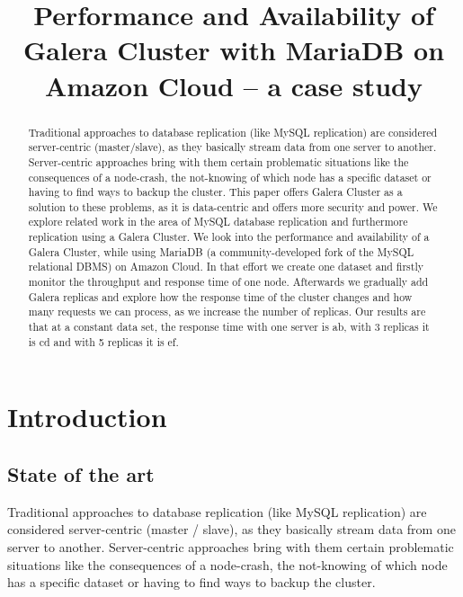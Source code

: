 \documentclass{sig-alternate}
\begin{document}

\doi{-}
\isbn{-}

\title{Performance and Availability of Galera Cluster with MariaDB on Amazon Cloud – a case study}



\maketitle
\begin{abstract}
Traditional approaches to database replication (like MySQL replication) are considered server-centric (master/slave), as they basically stream data from one server to another. Server-centric approaches bring with them certain problematic situations like the consequences of a node-crash, the not-knowing of which node has a specific dataset or having to find ways to backup the cluster. This paper offers Galera Cluster as a solution to these problems, as it is data-centric and offers more security and power. We explore related work in the area of MySQL database replication and furthermore replication using a Galera Cluster. We look into the performance and availability of a Galera Cluster, while using MariaDB (a community-developed fork of the MySQL relational DBMS) on Amazon Cloud. In that effort we create one dataset and firstly monitor the throughput and response time of one node. Afterwards we gradually add Galera replicas and explore how the response time of the cluster changes and how many requests we can process, as we increase the number of replicas. Our results are that at a constant data set, the response time with one server is ab, with 3 replicas it is cd and with 5 replicas it is ef.
\end{abstract}


\section{Introduction}
\subsection{State of the art}
Traditional approaches to database replication (like MySQL replication) are considered server-centric (master / slave), as they basically stream data from one server to another. Server-centric approaches bring with them certain problematic situations like the consequences of a node-crash, the not-knowing of which node has a specific dataset or having to find ways to backup the cluster.
\end{document}
